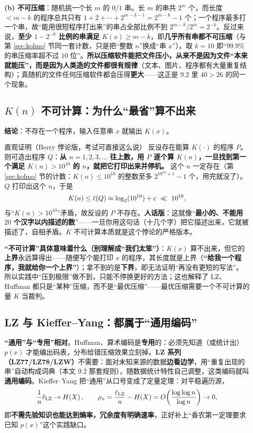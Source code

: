 \documentclass[11pt,a4paper]{ctexart}
\begin{document}
\textbf{(b) 不可压缩}：随机挑一个长 $m$ 的 $0/1$ 串。长 $m$ 的串共 $2^m$ 个，而长度 $<m-k$ 的程序总共只有 $1+2+\cdots+2^{m-k-1}=2^{m-k}-1$ 个；一个程序最多打一个串，故“能用很短程序打出来”的串占全部比例不到 $2^{m-k}/2^{m}=2^{-k}$。反过来说，\textbf{至少 $1-2^{-k}$ 比例的串满足 $K(x)\ge m-k$}，即\textbf{几乎所有串都不可压缩}（与第 \ref{sec:kolmo} 节同一套计数，只是把“整数 $n$”换成“串 $x$”）。取 $k=10$ 即“$99.9\%$ 的串压缩率超不过 $10$ 位”。\textbf{所以压缩软件能把文件压小，从来不是因为文件“本来就能压”，而是因为人类造的文件都很有规律}（文本、图片、程序都有大量重复结构）；真随机的文件任何压缩软件都会压得\textbf{更大}——这正是 9.2 里 $40>26$ 的同一个现象。

\subsection{$K(n)$ 不可计算：为什么“最省”算不出来}

\textbf{结论}：不存在一个程序，输入任意串 $x$ 就输出 $K(x)$。

\begin{qa}{直观证明（Berry 悖论版，考试可直接这么说）}
反设存在能算 $K(\cdot)$ 的程序 $P$。则可造出程序 $Q$：\textbf{从 $n=1,2,3,\dots$ 往上数，用 $P$ 逐个算 $K(n)$，一旦找到第一个满足 $K(n)>10^{10}$ 的 $n$，就把它打印出来并停机。}
这个 $n$ 一定存在（第 \ref{sec:kolmo} 节的计数：$K(n)\le10^{10}$ 的整数至多 $2^{10^{10}+1}-1$ 个，用完就没了）。$Q$ 打印出这个 $n$，于是
\[
K(n)\le\ell(Q)\approx\lb(10^{10})+c\ \ll\ 10^{10},
\]
与“$K(n)>10^{10}$”矛盾，故反设的 $P$ 不存在。\textbf{人话版}：这就像“\textbf{最小的、不能用 $20$ 个汉字以内描述的数}”——一旦你用这句话（十几个字）把它描述出来，它就被描述了，自相矛盾。$K$ 不可计算本质就是这个悖论的严格版本。
\end{qa}

\textbf{“不可计算”具体意味着什么（别理解成“我们太笨”）}：$K(x)$ 算不出来，但它的\textbf{上界}永远算得出——随便写个能打印 $x$ 的程序，其长度就是上界（\textbf{“给我一个程序，我就给你一个上界”}）；拿不到的是\textbf{下界}，即无法证明“再没有更短的写法”。所以实践中“压到极限”做不到，只能不停换更好的方法；这也解释了 LZ、Huffman 都只是“某种”压缩，而不是“最优压缩”——最优压缩需要一个不可计算的量 $K$ 当裁判。

\subsection{LZ 与 Kieffer--Yang：都属于“通用编码”}

\textbf{“通用”与“专用”相对}。Huffman、算术编码是\textbf{专用}的：必须先知道（或统计出）$p(x)$ 才能编出码表，分布给错压缩效果立刻掉。\textbf{LZ 系列（LZ77/LZ78/LZW）}不需要：面对未知来源的数据\textbf{边看边学}，用“重复出现的串”自动构成词典（本文 9.2 那套规则），随数据统计特性自己调整，这类编码就叫\textbf{通用编码}。Kieffer--Yang 把“通用”从口号变成了定量定理：对平稳遍历源，
\[
\frac{1}{n}\ell_{\text{LZ}}\to H\!\left(X\right),
\qquad
\rho_n=\frac{\ell_{\text{LZ}}}{n}-H\!\left(X\right)=O\!\left(\frac{\log\log n}{\log n}\right)\to0,
\]
即\textbf{不需先验知识也能达到熵率，冗余度有明确速率}，正好补上“香农第一定理要求已知 $p(x)$”这个实践缺口。
\end{document}
